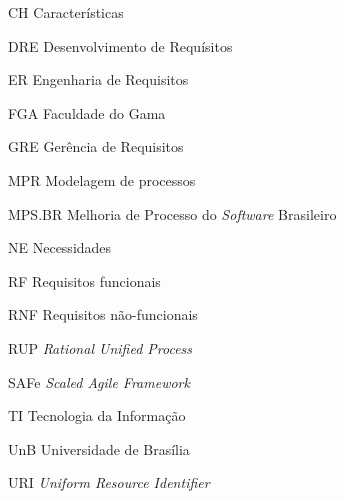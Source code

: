 \begin{siglas}
  \item[CH] Características
  \item[DRE] Desenvolvimento de Requísitos
  \item[ER] Engenharia de Requisitos
  \item[FGA] Faculdade do Gama
  \item[GRE] Gerência de Requisitos
  \item[MPR] Modelagem de processos
  \item[MPS.BR] Melhoria de Processo do \emph{Software} Brasileiro
  \item[NE] Necessidades
  \item[RF] Requisitos funcionais
  \item[RNF] Requisitos não-funcionais
  \item[RUP] \emph{Rational Unified Process}
  \item[SAFe] \emph{Scaled Agile Framework}
  \item[TI] Tecnologia da Informação
  \item[UnB] Universidade de Brasília
  \item[URI] \emph{Uniform Resource Identifier}
\end{siglas}

